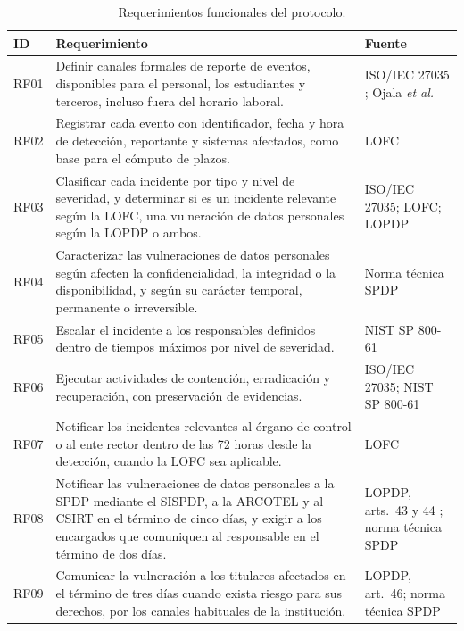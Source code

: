 \begin{table}[htbp]
  \centering
  \caption{Requerimientos funcionales del protocolo.}
  \label{tab:requerimientos_funcionales}
  \small
  \begin{tabular}{|L{\tabcolsep}|L{\tabcolsep}|L{\tabcolsep}|}
    \hline
    \textbf{ID} & \textbf{Requerimiento} & \textbf{Fuente} \\
    \hline
    RF01 & Definir canales formales de reporte de eventos, disponibles para el personal, los estudiantes y terceros, incluso fuera del horario laboral. & ISO/IEC 27035 \cite{iso27035_2023}; Ojala \textit{et al.} \cite{ojala2025cybersecurity} \\
    \hline
    RF02 & Registrar cada evento con identificador, fecha y hora de detección, reportante y sistemas afectados, como base para el cómputo de plazos. & LOFC \cite{lofc2026} \\
    \hline
    RF03 & Clasificar cada incidente por tipo y nivel de severidad, y determinar si es un incidente relevante según la LOFC, una vulneración de datos personales según la LOPDP o ambos. & ISO/IEC 27035; LOFC; LOPDP \\
    \hline
    RF04 & Caracterizar las vulneraciones de datos personales según afecten la confidencialidad, la integridad o la disponibilidad, y según su carácter temporal, permanente o irreversible. & Norma técnica SPDP \cite{spdp2026norma} \\
    \hline
    RF05 & Escalar el incidente a los responsables definidos dentro de tiempos máximos por nivel de severidad. & NIST SP 800-61 \cite{nist80061r3} \\
    \hline
    RF06 & Ejecutar actividades de contención, erradicación y recuperación, con preservación de evidencias. & ISO/IEC 27035; NIST SP 800-61 \\
    \hline
    RF07 & Notificar los incidentes relevantes al órgano de control o al ente rector dentro de las 72 horas desde la detección, cuando la LOFC sea aplicable. & LOFC \\
    \hline
    RF08 & Notificar las vulneraciones de datos personales a la SPDP mediante el SISPDP, a la ARCOTEL y al CSIRT en el término de cinco días, y exigir a los encargados que comuniquen al responsable en el término de dos días. & LOPDP, arts.~43 y 44 \cite{lopdp2021}; norma técnica SPDP \\
    \hline
    RF09 & Comunicar la vulneración a los titulares afectados en el término de tres días cuando exista riesgo para sus derechos, por los canales habituales de la institución. & LOPDP, art.~46; norma técnica SPDP \\

\end{tabular}
\end{table}
